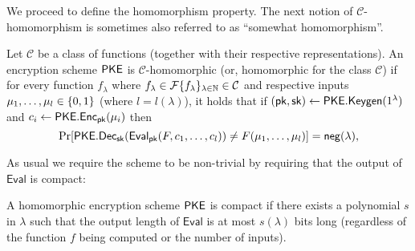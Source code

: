 \newcommand{\cclass}{\mathcal{C}}
We proceed to define the homomorphism property. The next notion of $\cclass$-homomorphism is sometimes also referred to as ``somewhat homomorphism''.

\begin{definition}[$\cclass$-homomorphism]
Let $\cclass$ be a class of functions (together with their respective representations).
An encryption scheme $\mathsf{PKE}$ is $\cclass$-homomorphic (or, homomorphic for the class $\cclass$) if for every function $f_\lambda$ where  $f_\lambda \in \mathcal{F} \funfam{f} \in \cclass$ and respective inputs $\mu_1,\dots,\mu_l \in \{0, 1\}$ (where $l = l(\lambda)$), it holds that if 
$(\mathsf{pk}, \mathsf{sk}) \gets \mathsf{PKE.Keygen}(1^{\lambda})$ and $c_i \gets \mathsf{PKE.Enc}_{\mathsf{pk}}(\mu_i)$
then 
\[
    \Pr[\mathsf{PKE.Dec}_{\mathsf{sk}}(\mathsf{Eval}_{\mathsf{pk}}(F, c_1,\dots, c_l)) \not = F(\mu_1,\dots,\mu_l)] = \mathsf{neg}(\lambda),
\]
\end{definition}





As usual we require the scheme to be non-trivial by requiring that the output 
of $\mathsf{Eval}$ is compact:
\begin{definition}\label{def:compact}
A homomorphic encryption scheme $\mathsf{PKE}$ is compact if there exists a polynomial $s$ in $\lambda$ such that the output length of $\mathsf{Eval}$ is at most $s(\lambda)$ bits long (regardless of the function $f$ being computed or the number of inputs). 
\end{definition}


